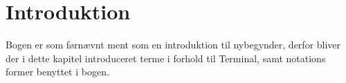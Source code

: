 \chapter{Introduktion}
Bogen er som førnævnt ment som en introduktion til nybegynder, derfor bliver der i dette kapitel introduceret terme i forhold til Terminal, samt notations former benyttet i bogen. 

